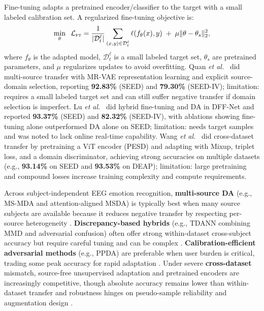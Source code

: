 \documentclass{WileyMSP-template}
\begin{document}
Fine-tuning adapts a pretrained encoder/classifier to the target with a small labeled calibration set. A regularized fine-tuning objective is:
\begin{equation}
\min_{\theta}\;\; \mathcal{L}_{\textsc{ft}}
=\frac{1}{|\mathcal{D}_t^{\ell}|}\sum_{(x,y)\in\mathcal{D}_t^{\ell}} \ell\!\left(f_{\theta}(x),y\right)\;+\;\mu \|\theta-\theta_s\|_2^2,
\label{eq:ft_subjectind}
\end{equation}
where $f_{\theta}$ is the adapted model, $\mathcal{D}_t^{\ell}$ is a small labeled target set, $\theta_s$ are pretrained parameters, and $\mu$ regularizes updates to avoid overfitting. Quan \textit{et al.}~\cite{quan2023bspc_multisource_transfer} did multi-source transfer with MR-VAE representation learning and explicit source-domain selection, reporting \textbf{92.83\%} (SEED) and \textbf{79.30\%} (SEED-IV); limitation: requires a small labeled target set and can still suffer negative transfer if domain selection is imperfect. Lu \textit{et al.}~\cite{lu2023frontiers_dffnet} did hybrid fine-tuning and DA in DFF-Net and reported \textbf{93.37\%} (SEED) and \textbf{82.32\%} (SEED-IV), with ablations showing fine-tuning alone outperformed DA alone on SEED; limitation: needs target samples and was noted to lack online real-time capability. Wang \textit{et al.}~\cite{wang2025eswa_pesd} did cross-dataset transfer by pretraining a ViT encoder (PESD) and adapting with Mixup, triplet loss, and a domain discriminator, achieving strong accuracies on multiple datasets (e.g., \textbf{93.14\%} on SEED and \textbf{93.53\%} on DEAP); limitation: large pretraining and compound losses increase training complexity and compute requirements.

Across subject-independent EEG emotion recognition, \textbf{multi-source DA} (e.g., MS-MDA and attention-aligned MSDA) is typically best when many source subjects are available because it reduces negative transfer by respecting per-source heterogeneity \cite{chen2021frontiers_msmda,yang2024ssaamsda}. \textbf{Discrepancy-based hybrids} (e.g., TDANN combining MMD and adversarial confusion) often offer strong within-dataset cross-subject accuracy but require careful tuning and can be complex \cite{bao2021frontiers_tdann}. \textbf{Calibration-efficient adversarial methods} (e.g., PPDA) are preferable when user burden is critical, trading some peak accuracy for rapid adaptation \cite{zhao2021aaai_ppda}. Under severe \textbf{cross-dataset} mismatch, source-free unsupervised adaptation and pretrained encoders are increasingly competitive, though absolute accuracy remains lower than within-dataset transfer and robustness hinges on pseudo-sample reliability and augmentation design \cite{imtiaz2025compbiomed_uda_gptds,wang2025eswa_pesd}. 
\end{document}
